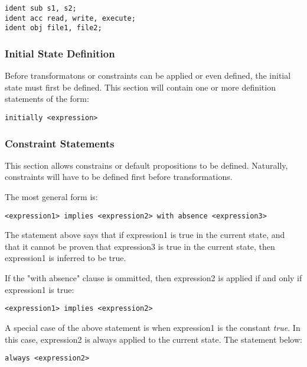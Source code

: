 \documentclass[a4paper]{article}
\begin{document}
\begin{verbatim}
ident sub s1, s2;
ident acc read, write, execute;
ident obj file1, file2;
\end{verbatim}

      \subsubsection{Initial State Definition}

        Before transformatons or constraints can be applied or even defined,
        the initial state must first be defined. This section will contain
        one or more definition statements of the form:

\begin{verbatim}
initially <expression>
\end{verbatim}

      \subsubsection{Constraint Statements}

        This section allows constrains or default propositions to be defined.
        Naturally, constraints will have to be defined first before
        transformations.

        The most general form is:

\begin{verbatim}
<expression1> implies <expression2> with absence <expression3>
\end{verbatim}

        The statement above says that if expression1 is true in the current
        state, and that it cannot be proven that expression3 is true in
        the current state, then expression1 is inferred to be true.

        If the "with absence" clause is ommitted, then expression2 is applied
        if and only if expression1 is true:

\begin{verbatim}
<expression1> implies <expression2>
\end{verbatim}

        A special case of the above statement is when expression1 is the
        constant \emph{true}. In this case, expression2 is always applied
        to the current state. The statement below:

\begin{verbatim}
always <expression2>
\end{verbatim}
\end{document}

